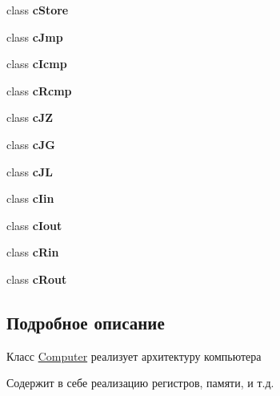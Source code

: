 \begin{DoxyCompactItemize}
\hypertarget{class_computer_ae67eb3dc4175713f1a79f74bd1d03eed}{}\label{class_computer_ae67eb3dc4175713f1a79f74bd1d03eed} 
class {\bfseries c\+Store}
\item 
\hypertarget{class_computer_accaf41340be465f8a862e40429ba9cfb}{}\label{class_computer_accaf41340be465f8a862e40429ba9cfb} 
class {\bfseries c\+Jmp}
\item 
\hypertarget{class_computer_af7af8f966cd39d199ce18113ecdd2ecb}{}\label{class_computer_af7af8f966cd39d199ce18113ecdd2ecb} 
class {\bfseries c\+Icmp}
\item 
\hypertarget{class_computer_a7c711c41af5fcddc63bc8e8c41f620f4}{}\label{class_computer_a7c711c41af5fcddc63bc8e8c41f620f4} 
class {\bfseries c\+Rcmp}
\item 
\hypertarget{class_computer_a784d5ff4da579d46119d42608ee66334}{}\label{class_computer_a784d5ff4da579d46119d42608ee66334} 
class {\bfseries c\+JZ}
\item 
\hypertarget{class_computer_a3adfd5a9699d8611e902f47cbdfc34d1}{}\label{class_computer_a3adfd5a9699d8611e902f47cbdfc34d1} 
class {\bfseries c\+JG}
\item 
\hypertarget{class_computer_a69be74228435ed08e42c04d34abd383a}{}\label{class_computer_a69be74228435ed08e42c04d34abd383a} 
class {\bfseries c\+JL}
\item 
\hypertarget{class_computer_a0b86d0871da7c7632d6c45491faae5ab}{}\label{class_computer_a0b86d0871da7c7632d6c45491faae5ab} 
class {\bfseries c\+Iin}
\item 
\hypertarget{class_computer_a02eb85182aba14840a06c5d5f9c4a4e4}{}\label{class_computer_a02eb85182aba14840a06c5d5f9c4a4e4} 
class {\bfseries c\+Iout}
\item 
\hypertarget{class_computer_a047a81456a9fc5a1160d96ac296fd762}{}\label{class_computer_a047a81456a9fc5a1160d96ac296fd762} 
class {\bfseries c\+Rin}
\item 
\hypertarget{class_computer_ad68469c232d5ffab3e425a9f058b9168}{}\label{class_computer_ad68469c232d5ffab3e425a9f058b9168} 
class {\bfseries c\+Rout}
\end{DoxyCompactItemize}


\subsection{Подробное описание}
Класс \hyperlink{class_computer}{Computer} реализует архитектуру компьютера 

Содержит в себе реализацию регистров, памяти, и т.\+д. 


